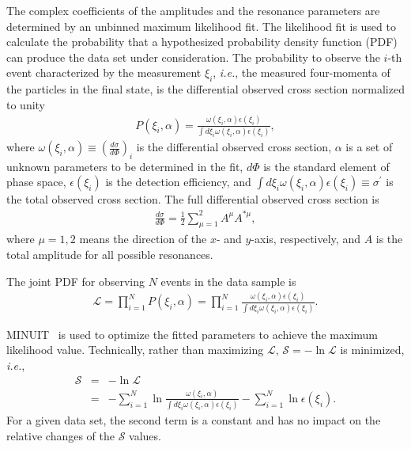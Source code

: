 \documentclass[twocolumn,showpacs,aps,prd]{revtex4-1}
\begin{document}
The complex coefficients of the amplitudes and the resonance parameters are determined by an unbinned maximum likelihood fit.
The likelihood fit is used to calculate the probability that a hypothesized probability density function (PDF) can produce the data set under consideration.
The probability to observe the $i$-th event characterized by the measurement $\xi_i$, \textit{i.e.}, the measured four-momenta of the particles
in the final state, is the differential observed cross section normalized to unity
%
\begin{eqnarray}
  \label{PDF0}
  P(\xi_i, \alpha) = \frac{\omega(\xi_i, \alpha) \epsilon(\xi_i)}{\int d\xi_i \omega(\xi_i, \alpha) \epsilon(\xi_i)},
\end{eqnarray}
%
where $\omega(\xi_i, \alpha) \equiv (\frac{d\sigma}{d\Phi})_i$ is the differential observed cross section, $\alpha$ is a set of unknown parameters
to be determined in the fit, $d\Phi$ is the standard element of phase space, $\epsilon(\xi_i)$ is the detection efficiency,
and $\int d\xi_i \omega(\xi_i, \alpha) \epsilon(\xi_i) \equiv \sigma^\prime$ is the total observed cross section. The full differential observed cross section is
%
\begin{eqnarray}
  \label{DifCS}
  \frac{d\sigma}{d\Phi} = \frac{1}{2}\sum_{\mu=1}^{2} A^{\mu}A^{*\mu},
\end{eqnarray}
where $\mu = 1,2$ means the direction of the $x$- and $y$-axis, respectively, and $A$ is the total amplitude for all possible resonances.


The joint PDF for observing $N$ events in the data sample is
%
\begin{eqnarray}
  \label{PDF1}
   \mathcal{L} = \prod\limits_{i=1}^N P(\xi_i, \alpha) = \prod\limits_{i=1}^N \frac{\omega(\xi_i, \alpha) \epsilon(\xi_i)}
   {\int d\xi_i \omega(\xi_i, \alpha) \epsilon(\xi_i)}.
\end{eqnarray}
%

MINUIT~\cite{Minuit,qzhzhao} is used to optimize the fitted parameters to achieve the maximum likelihood value. Technically, rather
than maximizing $\mathcal L$, $\mathcal S = -\ln\mathcal L$ is minimized, \textit{i.e.},
%
\begin{eqnarray}
  \label{lnL}
  \mathcal{S} &=& -\ln\mathcal{L} \nonumber\\
              &=& -\sum_{i=1}^N \ln\frac{\omega(\xi_i, \alpha)}{\int d\xi_i \omega(\xi_i, \alpha) \epsilon(\xi_i)} -
                  \sum_{i=1}^N \ln \epsilon(\xi_i).
\end{eqnarray}
%
For a given data set, the second term is a constant and has no impact on the relative changes of the $\mathcal S$ values.
\end{document}
